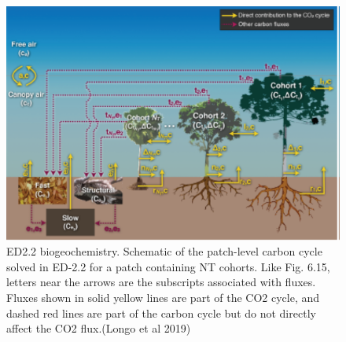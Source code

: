 \documentclass[
  12pt,
  oneside]{book}
\begin{document}
\begin{figure}

{\centering \includegraphics[width=0.8\linewidth]{figures/chap6/f617_ED_biogeochemistry} 

}

\caption{ ED2.2 biogeochemistry. Schematic of the patch-level carbon cycle solved in ED-2.2 for a patch containing NT cohorts. Like Fig. 6.15, letters near the arrows are the subscripts associated with fluxes. Fluxes shown in solid yellow lines are part of the CO2 cycle, and dashed red lines are part of the carbon cycle but do not directly affect the CO2 flux.(Longo et al 2019)}\label{fig:f617}
\end{figure}
\end{document}

